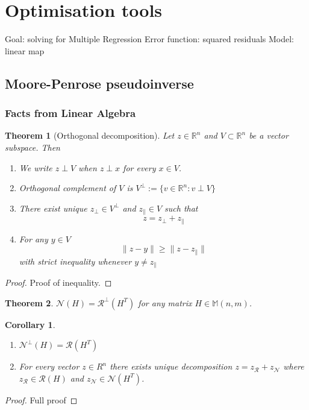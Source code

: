 \documentclass[a4paper]{article}
\theoremstyle{break}
\newtheorem{theorem}{Theorem}[section]
\newtheorem{corollary}{Corollary}[theorem]
\newcommand{\R}{\mathbb{R}}
\newcommand{\Nu}{\mathcal{N}}
\newcommand{\Ra}{\mathcal{R}}
\newcommand{\Mat}[2]{\mathbb{M}(#1, #2)}
\newcommand{\pll}{\parallel}
\begin{document}
\section{Optimisation tools}
Goal: solving for Multiple Regression
Error function: squared residuals
Model: linear map

\subsection{Moore-Penrose pseudoinverse}
\subsubsection{Facts from Linear Algebra}

\begin{theorem}[Orthogonal decomposition]
    Let $z \in \R^n$ and $V \subset \R^n$ be a vector subspace. Then
    \begin{enumerate}
        \item We write $z \perp V$ when $ z \perp x$ for every $x \in V$.
        \item Orthogonal complement of $V$ is $V^\perp := \{ v \in \R^n : v \perp V\}$
        \item There exist unique $z_\perp \in V^\perp$ and $z_\pll \in V$ such that  
            \begin{equation}
                z = z_\perp + z_\pll
            \end{equation}
        \item For any $y \in V$
        \begin{equation}
                \| z - y \| \geq \| z - z_\pll \|
        \end{equation}
        with strict inequality whenever $y \neq z_\pll$
    \end{enumerate}
\end{theorem}
\begin{proof}
    Proof of inequality.
\end{proof}

\begin{theorem}
    $\Nu(H) = \Ra^\perp(H^T)$ for any matrix $H \in \Mat{n}{m}$.
\end{theorem}

\begin{corollary}
\begin{enumerate}
    \item  $\Nu^\perp(H) = \Ra(H^T)$
    \item  For every vector $z \in R^n$ there exists unique decomposition $z = z_\Ra + z_\Nu$ where $z_\Ra \in \Ra(H)$ and $z_\Nu \in \Nu(H^T)$.
\end{enumerate}
\end{corollary}
\begin{proof}
    Full proof
\end{proof}
\end{document}
